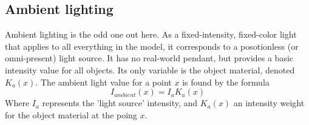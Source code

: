 \subsection{Ambient lighting}
Ambient lighting is the odd one out here. As a fixed-intensity, fixed-color
light that applies to all everything in the model, it corresponds to a
posotionless (or omni-present) light source. It has no real-world pendant, but
provides a basic intensity value for all objects. Its only variable is the
object material, denoted $K_{a}(x)$. The ambient light value for a point $x$ is
found by the formula $$I_{ambient}(x) = I_{a}K_{a}(x)$$ Where $I_{a}$
represents the 'light source' intensity, and $K_{a}(x)$ an intensity weight for
the object material at the poing $x$.
